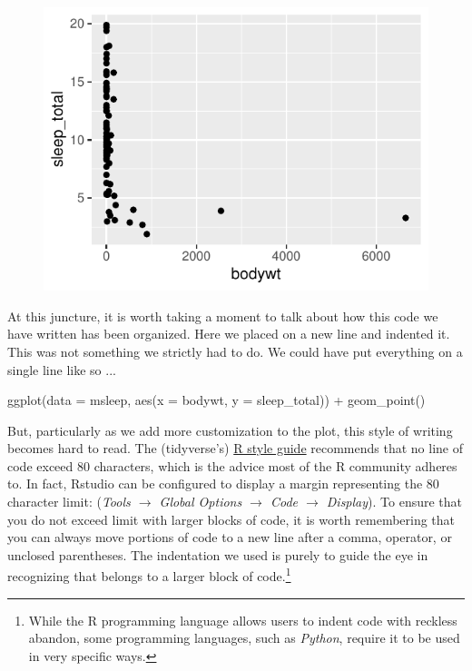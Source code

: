 \begin{figure}[H]
\includegraphics[scale = 0.75]{graphics/ch2Figs/ggEx_2.pdf}
\label{fig:ggEx_2.pdf}
\end{figure}

\noindent
At this juncture, it is worth taking a moment to talk about how this code we have written has been organized. Here we placed  on a new line and indented it.  This was not something we strictly had to do.  We could have put everything on a single line like so ...

\begin{inR}
ggplot(data = msleep, aes(x = bodywt, y = sleep_total)) + geom_point()
\end{inR}

\vspace{1em}

\noindent
But, particularly as we add more customization to the plot, this style of writing becomes hard to read. The (tidyverse's) \href{https://style.tidyverse.org/syntax.html#long-lines}{R style guide} recommends that no line of code exceed 80 characters, which is the advice most of the R community adheres to. In fact, Rstudio can be configured to display a margin representing the 80 character limit: (\textit{Tools $\rightarrow$ Global Options $\rightarrow$ Code $\rightarrow$ Display}). To ensure that you do not exceed limit with larger blocks of code, it is worth remembering that you can always move portions of code to a new line after a comma, operator, or unclosed parentheses. The indentation we used is purely to guide the eye in recognizing that  belongs to a larger block of code.\footnote{While the R programming language allows users to indent code with reckless abandon, some programming languages, such as \textit{Python}, require it to be used in very specific ways.}

